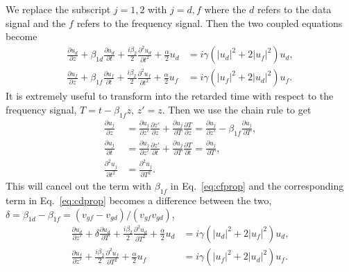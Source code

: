 We replace the subscript $j=1,2$ with $j=d,f$ where the $d$ refers to the data signal and the $f$ refers to the frequency signal. Then the two coupled equations become
%
\begin{subequations}
\begin{align}
\frac{\partial u_d}{\partial z} + \beta_{1d}\frac{\partial u_d}{\partial t} + \frac{i\beta_{2}}{2}\frac{\partial^2 u_d}{\partial t^2} + \frac{\alpha}{2}u_d &= i\gamma\left(|u_d|^2 + 2|u_f|^2\right)u_d, \label{eq:cdprop} \\
\frac{\partial u_f}{\partial z} + \beta_{1f}\frac{\partial u_f}{\partial t} + \frac{i\beta_{2}}{2}\frac{\partial^2 u_f}{\partial t^2} + \frac{\alpha}{2}u_f &= i\gamma\left(|u_f|^2 + 2|u_d|^2\right)u_f. \label{eq:cfprop}
\end{align}
\end{subequations}
%
It is extremely useful to transform into the retarded time with respect to the frequency signal, $T = t - \beta_{1f}z$, $z' = z$. Then we use the chain rule to get
%
\begin{subequations}
\begin{align}
\frac{\partial u_j}{\partial z} &= \frac{\partial u_j}{\partial z'}\frac{\partial z'}{\partial z} + \frac{\partial u_j}{\partial T}\frac{\partial T}{\partial z} =  \frac{\partial u_j}{\partial z'} - \beta_{1f}\frac{\partial u_j}{\partial T}, \\
\frac{\partial u_j}{\partial t} &= \frac{\partial u_j}{\partial z'}\frac{\partial z'}{\partial t} + \frac{\partial u_j}{\partial T}\frac{\partial T}{\partial t} =  \frac{\partial u_j}{\partial T}, \\
\frac{\partial^2 u_j}{\partial t^2} &= \frac{\partial^2 u_j}{\partial T^2}.
\end{align}
\end{subequations}
%
This will cancel out the term with $\beta_{1f}$ in Eq.~\ref{eq:cfprop} and the corresponding term in Eq.~\ref{eq:cdprop} becomes a difference between the two, $\delta = \beta_{1d} - \beta_{1f} = (v_{gf} - v_{gd})/(v_{gf}v_{gd})$,
%
\begin{subequations}
\begin{align}
\frac{\partial u_d}{\partial z'} + \delta\frac{\partial u_d}{\partial T} + \frac{i\beta_{2}}{2}\frac{\partial^2 u_d}{\partial T^2} + \frac{\alpha}{2}u_d &= i\gamma\left(|u_d|^2 + 2|u_f|^2\right)u_d, \label{eq:dataprop} \\
\frac{\partial u_f}{\partial z'} + \frac{i\beta_{2}}{2}\frac{\partial^2 u_f}{\partial T^2} + \frac{\alpha}{2}u_f &= i\gamma\left(|u_f|^2 + 2|u_d|^2\right)u_f. \label{eq:freqprop}
\end{align}
\end{subequations}
%

